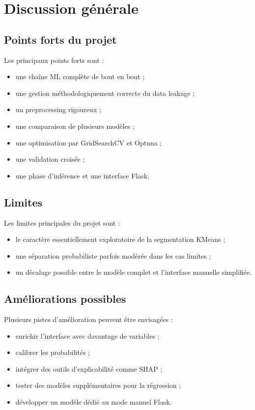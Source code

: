 \documentclass[11pt,a4paper]{article}
\begin{document}
\section{Discussion générale}

\subsection{Points forts du projet}
Les principaux points forts sont :
\begin{itemize}
    \item une chaîne ML complète de bout en bout ;
    \item une gestion méthodologiquement correcte du data leakage ;
    \item un preprocessing rigoureux ;
    \item une comparaison de plusieurs modèles ;
    \item une optimisation par GridSearchCV et Optuna ;
    \item une validation croisée ;
    \item une phase d’inférence et une interface Flask.
\end{itemize}

\subsection{Limites}
Les limites principales du projet sont :
\begin{itemize}
    \item le caractère essentiellement exploratoire de la segmentation KMeans ;
    \item une séparation probabiliste parfois modérée dans les cas limites ;
    \item un décalage possible entre le modèle complet et l’interface manuelle simplifiée.
\end{itemize}

\subsection{Améliorations possibles}
Plusieurs pistes d’amélioration peuvent être envisagées :
\begin{itemize}
    \item enrichir l’interface avec davantage de variables ;
    \item calibrer les probabilités ;
    \item intégrer des outils d’explicabilité comme SHAP ;
    \item tester des modèles supplémentaires pour la régression ;
    \item développer un modèle dédié au mode manuel Flask.
\end{itemize}
\end{document}
